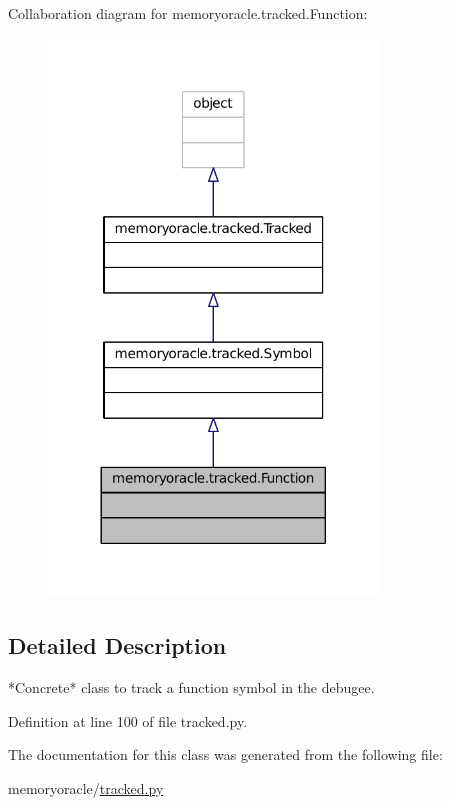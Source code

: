 Collaboration diagram for memoryoracle.\+tracked.\+Function\+:
\nopagebreak
\begin{figure}[H]
\begin{center}
\leavevmode
\includegraphics[width=248pt]{classmemoryoracle_1_1tracked_1_1Function__coll__graph}
\end{center}
\end{figure}


\subsection{Detailed Description}
\begin{DoxyVerb}*Concrete* class to track a function symbol in the debugee.
\end{DoxyVerb}
 

Definition at line 100 of file tracked.\+py.



The documentation for this class was generated from the following file\+:\begin{DoxyCompactItemize}
\item 
memoryoracle/\hyperlink{tracked_8py}{tracked.\+py}\end{DoxyCompactItemize}
